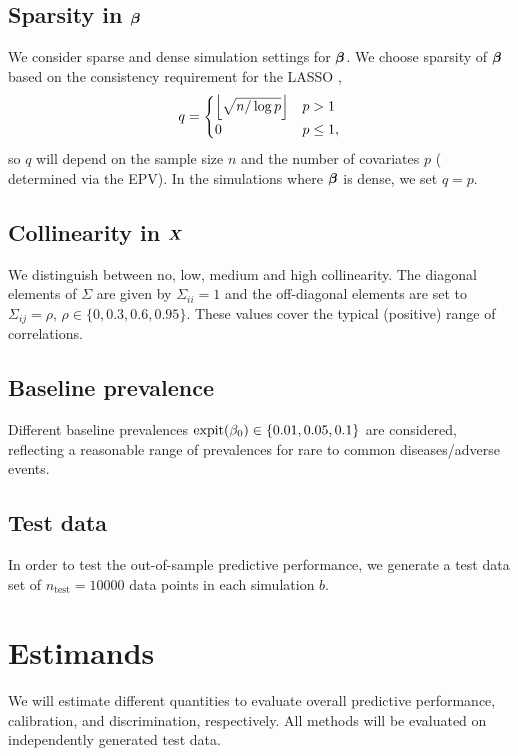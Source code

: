 \documentclass[a4paper, 11pt]{article}\usepackage[]{graphicx}\usepackage[]{color}
\begin{document}
\subsection*{Sparsity in $\text{\boldmath$\beta$}$}
We consider sparse and dense simulation settings for $\text{\boldmath$\beta$}$. We choose
sparsity of $\text{\boldmath$\beta$}$ based on the consistency requirement for the LASSO
\citep[Ch. 2.4.2]{buhlmann2011statistics}, \ie
$$q = \begin{cases}
  \left\lfloor\sqrt{n/\log p}\right\rfloor & p > 1 \\
  0 & p \leq 1,
\end{cases}$$
so $q$ will depend on the sample size
$n$ and the number of covariates $p$ ( determined via the EPV).
In the simulations where $\text{\boldmath$\beta$}$ is dense, we set $q = p$.

\subsection*{Collinearity in $\text{\boldmath$X$}$}
We distinguish between no, low, medium and high collinearity. The diagonal
elements of $\Sigma$ are given by $\Sigma_{ii} = 1$ and the off-diagonal
elements are set to $\Sigma_{ij} = \rho$, $\rho \in \{0, 0.3, 0.6, 0.95\}$.
These values cover the typical (positive) range of correlations.

\subsection*{Baseline prevalence}
Different baseline prevalences $\operatorname{expit}(\beta_0) \in \{0.01, 0.05, 0.1\}$ are 
considered, reflecting a reasonable range of prevalences for rare to
common diseases/adverse events.

\subsection*{Test data}
In order to test the out-of-sample predictive performance, we generate a test data set of
$n_{\text{test}} = 10000$ data points in each simulation $b$.

\section{Estimands} \label{sec:estimands}
We will estimate different quantities to evaluate overall predictive performance,
calibration, and discrimination, respectively. All methods will be evaluated on
independently generated test data.
\end{document}
